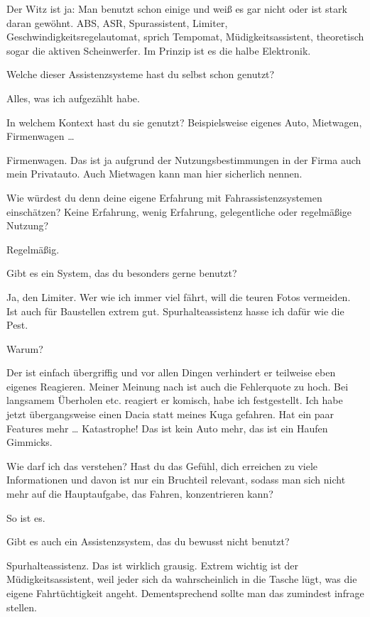 Der Witz ist ja: Man benutzt schon einige und weiß es gar nicht oder ist
stark daran gewöhnt. ABS, ASR, Spurassistent, Limiter,
Geschwindigkeitsregelautomat, sprich Tempomat, Müdigkeitsassistent,
theoretisch sogar die aktiven Scheinwerfer. Im Prinzip ist es die halbe
Elektronik.

\interviewerin
Welche dieser Assistenzsysteme hast du selbst schon genutzt?

Alles, was ich aufgezählt habe.

\interviewerin
In welchem Kontext hast du sie genutzt? Beispielsweise eigenes Auto,
Mietwagen, Firmenwagen …

Firmenwagen. Das ist ja aufgrund der Nutzungsbestimmungen in der Firma
auch mein Privatauto. Auch Mietwagen kann man hier sicherlich nennen.

\interviewerin
Wie würdest du denn deine eigene Erfahrung mit Fahrassistenzsystemen
einschätzen? Keine Erfahrung, wenig Erfahrung, gelegentliche oder
regelmäßige Nutzung?

Regelmäßig.

\interviewerin
Gibt es ein System, das du besonders gerne benutzt?

Ja, den Limiter. Wer wie ich immer viel fährt, will die teuren Fotos
vermeiden. Ist auch für Baustellen extrem gut. Spurhalteassistenz hasse
ich dafür wie die Pest.

\interviewerin
Warum?

Der ist einfach übergriffig und vor allen Dingen verhindert er
teilweise eben eigenes Reagieren. Meiner Meinung nach ist auch die
Fehlerquote zu hoch. Bei langsamem Überholen etc. reagiert er komisch,
habe ich festgestellt. Ich habe jetzt übergangsweise einen Dacia statt
meines Kuga gefahren. Hat ein paar Features mehr … Katastrophe! Das ist
kein Auto mehr, das ist ein Haufen Gimmicks.

\interviewerin
Wie darf ich das verstehen? Hast du das Gefühl, dich erreichen zu viele
Informationen und davon ist nur ein Bruchteil relevant, sodass man sich
nicht mehr auf die Hauptaufgabe, das Fahren, konzentrieren kann?

So ist es.

\interviewerin
Gibt es auch ein Assistenzsystem, das du bewusst nicht benutzt?

Spurhalteassistenz. Das ist wirklich grausig. Extrem wichtig ist der
Müdigkeitsassistent, weil jeder sich da wahrscheinlich in die Tasche
lügt, was die eigene Fahrtüchtigkeit angeht. Dementsprechend sollte man
das zumindest infrage stellen.

